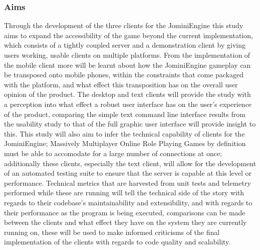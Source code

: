 \documentclass{article}
\begin{document}
	\subsubsection{Aims}
	Through the development of the three clients for the JominiEngine this study aims to expand the accessibility of the game beyond the current implementation, which consists of a tightly coupled server and a demonstration client by giving users working, usable clients on multiple platforms. From the implementation of the mobile client more will be learnt about how the JominiEngine gameplay can be transposed onto mobile phones, within the constraints that come packaged with the platform, and what effect this transposition has on the overall user opinion of the product. The desktop and text clients will provide the study with a perception into what effect a robust user interface has on the user's experience of the product, comparing the simple text command line interface results from the usability study to that of the full graphic user interface will provide insight to this. This study will also aim to infer the technical capability of clients for the JominiEngine; Massively Multiplayer Online Role Playing Games by definition must be able to accomodate for a large number of connections at once; additionally these clients, especially the text client, will allow for the development of an automated testing suite to ensure that the server is capable at this level or performance. Technical metrics that are harvested from unit tests and telemetry performed while these are running will tell the technical side of the story with regards to their codebase's maintainability and extensibility, and with regards to their performance as the program is being executed, comparisons can be made between the clients and what effect they have on the system they are currently running on, these will be used to make informed criticisms of the final implementation of the clients with regards to code quality and scalability.
\end{document}
